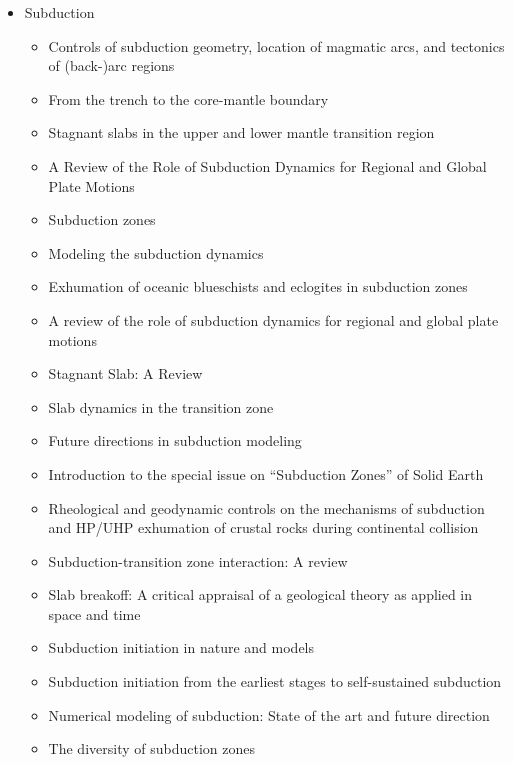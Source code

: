 \begin{itemize}

\item Subduction
   \begin{itemize}
   \item [\nineteeneightytwo] Controls of subduction geometry, location of magmatic arcs, 
         and tectonics of (back-)arc regions \cite{crpi82}
   \item [\nineteenninetyfive] From the trench to the core-mantle boundary \cite{kinc95}
   \item [\twothousandone] Stagnant slabs in the upper and lower mantle transition region \cite{fuwo01}
   \item [\twothousandone] A Review of the Role of Subduction Dynamics for Regional and Global Plate Motions \cite{befa09}
   \item [\twothousandtwo] Subduction zones \cite{ster02}
   \item [\twothousandeight] Modeling the subduction dynamics \cite{bill08}
   \item [\twothousandnine] Exhumation of oceanic blueschists and eclogites in subduction zones \cite{agyj09}
   \item [\twothousandnine] A review of the role of subduction dynamics for regional and global plate motions \cite{befa09}
   \item [\twothousandnine] Stagnant Slab: A Review \cite{fuon09}
   \item [\twothousandten] Slab dynamics in the transition zone \cite{bill10}
   \item [\twothousandeleven] Future directions in subduction modeling \cite{gery11}
   \item [\twothousandthirteen] Introduction to the special issue on ``Subduction Zones'' of Solid Earth \cite{bufv13}
   \item [\twothousandfourteen] Rheological and geodynamic controls on the mechanisms of subduction and HP/UHP exhumation 
                of crustal rocks during continental collision \cite{bufa14,bufy14b}
   \item [\twothousandseventeen] Subduction-transition zone interaction: A review \cite{goav17}
   \item [\twothousandeighteen] Slab breakoff: A critical appraisal of a geological theory as applied in space and time \cite{garm18}
   \item [\twothousandeighteen] Subduction initiation in nature and models \cite{stge18}
   \item [\twothousandtwentytwo] Subduction initiation from the earliest stages to self-sustained subduction \cite{laar21}
   \item [\twothousandtwentytwo] Numerical modeling of subduction: State of the art and future direction \cite{gery22}
   \item [\twothousandtwentytwo] The diversity of subduction zones \cite{chmm22}
   \end{itemize}


\end{itemize}
